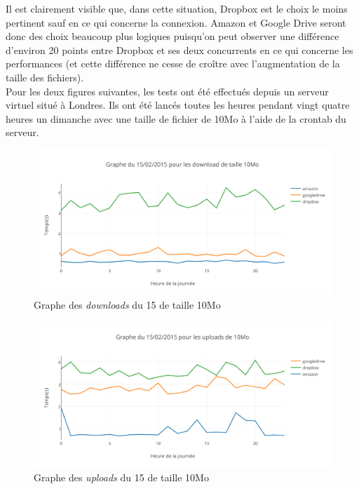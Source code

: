\documentclass[10pt]{article}
\begin{document}
Il est clairement visible que, dans cette situation, Dropbox est le choix le moins pertinent sauf en ce qui concerne la connexion. Amazon et Google Drive seront donc des choix beaucoup plus logiques puisqu'on peut observer une différence d'environ 20 points entre Dropbox et ses deux concurrents en ce qui concerne les performances (et cette différence ne cesse de croître avec l'augmentation de la taille des fichiers).\\

Pour les deux figures suivantes, les tests ont été effectués depuis un serveur virtuel situé à Londres. Ils ont été lancés toutes les heures pendant vingt quatre heures un dimanche avec une taille de fichier de 10Mo à l'aide de la crontab du serveur.


\begin{figure}[h]
\centering
\includegraphics[scale=0.7]{graphe_du_15022015_pour_les_download_de_taille_10mo.png}
\caption{Graphe des \textit{downloads} du 15 de taille 10Mo}
\end{figure}

\newpage

\begin{figure}[h]
\centering
\includegraphics[scale=0.7]{graphe_du_15022015_pour_les_uploads_de_10mo.png}
\caption{Graphe des \textit{uploads} du 15 de taille 10Mo}
\end{figure}
\end{document}
